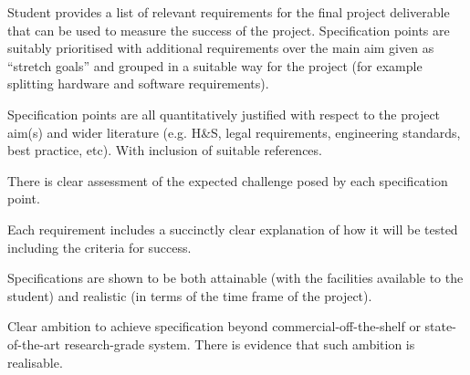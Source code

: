 Student provides a list of relevant requirements for the final project deliverable that can be used to measure the success of the project. Specification points are suitably prioritised with additional requirements over the main aim given as “stretch goals” and grouped in a suitable way for the project (for example splitting hardware and software requirements).

Specification points are all quantitatively justified with respect to the project aim(s) and wider literature (e.g. H&S, legal requirements, engineering standards, best practice, etc). With inclusion of suitable references.

There is clear assessment of the expected challenge posed by each specification point.

Each requirement includes a succinctly clear explanation of how it will be tested including the criteria for success.

Specifications are shown to be both attainable (with the facilities available to the student) and realistic (in terms of the time frame of the project).  

Clear ambition to achieve specification beyond commercial-off-the-shelf or state-of-the-art research-grade system. There is evidence that such ambition is realisable. 